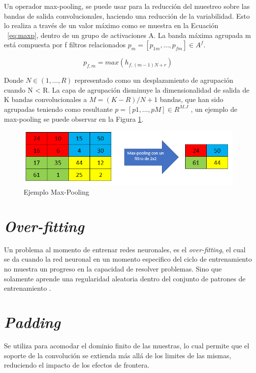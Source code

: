 Un operador max-pooling, se puede usar para la reducción del muestreo sobre las bandas de salida convolucionales, haciendo una reducción de la variabilidad. Esto lo realiza a través de un valor máximo como se muestra en la Ecuación ~\ref{eq:maxp}, dentro de un grupo de activaciones A. La banda máxima agrupada m está compuesta por f filtros relacionados $p_{m}=[p_{1m},...,p_{fm}] \in A^f$.

\begin{equation}
	\label{eq:maxp}
	p_{f,m}=max(h_{f,(m-1)N+r})
\end{equation}

Donde $N \in (1,...,R) $ representado como un desplazamiento de agrupación cuando N < R. La capa de agrupación disminuye la dimensionalidad de salida de K bandas convolucionales a $M=(K-R)/N+1$ bandas, que han sido agrupadas teniendo como resultante $p=[p1,...,pM] \in R^{M.J}$ \cite{gholamalinezhad2020pooling}, un ejemplo de max-pooling se puede observar en la Figura \ref{mp}.

\begin{figure}[ht]
	\centering
	\includegraphics[scale=0.6]{Figs/mp.png}
	\caption{Ejemplo Max-Pooling}
	\label{mp}
\end{figure}

\section{\textit{Over-fitting}}

Un problema al momento de entrenar redes neuronales, es el \textit{over-fitting}, el cual se da cuando la red neuronal en un momento especifico del ciclo de entrenamiento no muestra un progreso en la capacidad de resolver problemas. Sino que solamente aprende una regularidad aleatoria dentro del conjunto de patrones de entrenamiento \cite{jabbar2015methods}.

\section{\textit{Padding}}

Se utiliza para acomodar el dominio finito de las muestras, lo cual permite que el soporte de la convolución se extienda más allá de los limites de las mismas, reduciendo el impacto de los efectos de frontera.\\

